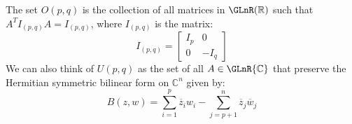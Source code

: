     \begin{example}
        The set $O(p,q)$ is the collection of all matrices in
        $\GLnR(\mathbb{R})$ such that $A^{T}I_{(p,q)}A=I_{(p,q)}$, where
        $I_{(p,q)}$ is the matrix:
        \begin{equation}
            I_{(p,q)}=
            \begin{bmatrix}
                I_{p}&0\\
                0&\minus{I}_{q}
            \end{bmatrix}
        \end{equation}
        We can also think of $U(p,q)$ as the set of all
        $A\in\GLnR{\mathbb{C}}$ that preserve the Hermitian symmetric
        bilinear form on $\mathbb{C}^{n}$ given by:
        \begin{equation}
            B(z,w)=\sum_{i=1}^{p}\overline{z}_{i}w_{i}-
                \sum_{j=p+1}^{n}\overline{z}_{j}\overline{w}_{j}
        \end{equation}
    \end{example}
